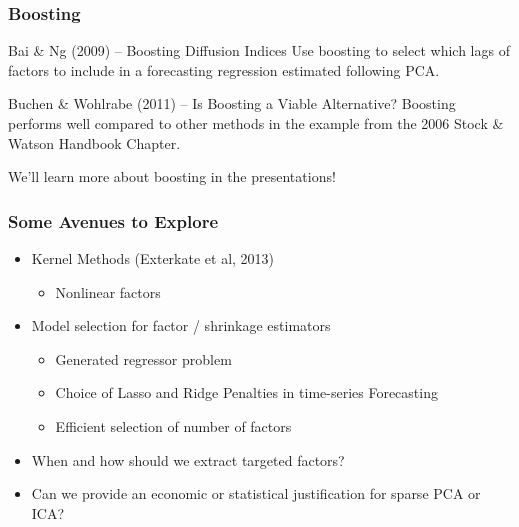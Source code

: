 \documentclass[handout]{beamer}
\begin{document}
\begin{frame}[c]\frametitle{Boosting}
    

 \begin{block}
 	{Bai \& Ng (2009) -- Boosting Diffusion Indices}
 	Use boosting to select which lags of factors to include in a forecasting regression estimated following PCA. 
 \end{block}

 \begin{block}
 	{Buchen \& Wohlrabe (2011) -- Is Boosting a Viable Alternative?}
 	Boosting performs well compared to other methods in the example from the 2006 Stock \& Watson Handbook Chapter.
 \end{block}

\vspace{1em}
\alert{We'll learn more about boosting in the presentations!}
\end{frame}
\begin{frame}[c]\frametitle{Some Avenues to Explore}
   
\begin{itemize}
	\item Kernel Methods (Exterkate et al, 2013) 
		\begin{itemize}
			\item Nonlinear factors
		\end{itemize}
	\item Model selection for factor / shrinkage estimators
		\begin{itemize}
			\item Generated regressor problem
			\item Choice of Lasso and Ridge Penalties in time-series Forecasting 
			\item Efficient selection of number of factors
		\end{itemize}
	\item When and how should we extract targeted factors?
	\item Can we provide an economic or statistical justification for sparse PCA or ICA?
\end{itemize}

\end{frame}
\end{document}
